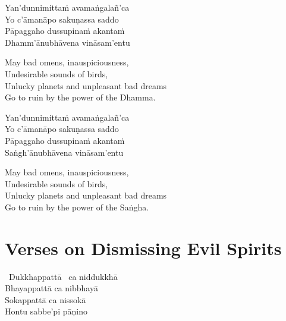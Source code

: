 \begin{pali-hang-continued}
  Yan'dunnimittaṁ avamaṅgalañ'ca\\
  Yo c'āmanāpo sakuṇassa saddo\\
  Pāpaggaho dussupinaṁ akantaṁ\\
  Dhamm'ānubhāvena vināsam'entu
\end{pali-hang-continued}

\begin{english-verses}
  May bad omens, inauspiciousness,\\
  Undesirable sounds of birds,\\
  Unlucky planets and unpleasant bad dreams\\
  Go to ruin by the power of the Dhamma.
\end{english-verses}

\ifninebythirteen\clearpage\fi

\begin{pali-hang-continued}
  Yan'dunnimittaṁ avamaṅgalañ'ca\\
  Yo c'āmanāpo sakuṇassa saddo\\
  Pāpaggaho dussupinaṁ akantaṁ\\
  Saṅgh'ānubhāvena vināsam'entu
\end{pali-hang-continued}

\ifbfive\clearpage\fi

\begin{english-verses}
  May bad omens, inauspiciousness,\\
  Undesirable sounds of birds,\\
  Unlucky planets and unpleasant bad dreams\\
  Go to ruin by the power of the Saṅgha.
\end{english-verses}

\ifafive \vspace{-0.4em} \fi

\suttaRef{[Trad]}



\section{Verses on Dismissing Evil Spirits}
\label{dismissing-the-devatas}

\begin{pali-hang-together}
  \anglebracketleft\ \hspace{-0.5mm}Dukkhappattā \hspace{-0.5mm}\anglebracketright\ ca niddukkhā\\
  Bhayappattā ca nibbhayā\\
  Sokappattā ca nissokā\\
  Hontu sabbe'pi pāṇino
\end{pali-hang-together}

